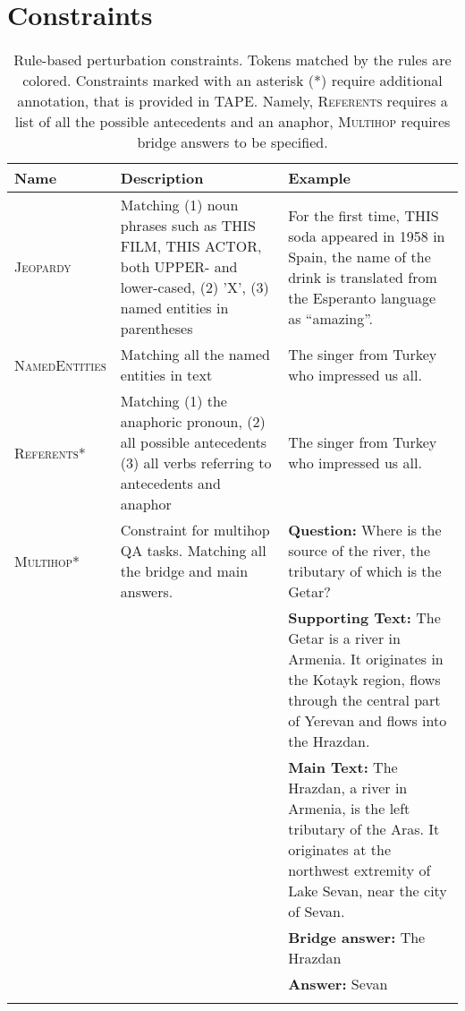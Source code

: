 \documentclass[11pt]{article}
\begin{document}
\onecolumn
\section{Constraints}
\label{app:constraints}


\begin{minipage}[hb!][20cm][t]{\textwidth}
\centering
\scriptsize
\begin{longtable}{lp{}p{}}
\toprule
\textbf{Name} &
  \textbf{Description} &
  \textbf{Example} \\ \midrule 
  \textsc{Jeopardy} & Matching (1) noun phrases such as THIS FILM, THIS ACTOR, both UPPER- and lower-cased, (2) 'X', (3) named entities in parentheses & For the first time, \colorbox{cb-salmon-pink}{THIS soda} appeared in 1958 in Spain, the name of the drink is translated from the Esperanto language as \colorbox{cb-salmon-pink}{“amazing”}. \\
  \midrule 
  \textsc{NamedEntities} & Matching all the named entities in text & The singer from \colorbox{cb-salmon-pink}{Turkey} who impressed us all. \\
  \midrule
  \textsc{Referents*} & Matching (1) the anaphoric pronoun, (2) all possible antecedents (3) all verbs referring to antecedents and anaphor & The \colorbox{cb-salmon-pink}{singer} from {Turkey} \colorbox{cb-salmon-pink}{who} \colorbox{cb-salmon-pink}{impressed} us all. \\
  \midrule
  \textsc{Multihop*} & Constraint for multihop QA tasks. Matching all the bridge and main answers. & \textbf{Question:} Where is the source of the river, the tributary of which is the Getar? \\
  & & \textbf{Supporting Text:} The \colorbox{cb-salmon-pink}{Getar} is a river in Armenia. It originates in the Kotayk region, flows through the central part of Yerevan and flows into \colorbox{cb-salmon-pink}{the Hrazdan}. \\
  & & \textbf{Main Text:} \colorbox{cb-salmon-pink}{The Hrazdan}, a river in Armenia, is the left tributary of the Aras. It originates at the northwest extremity of Lake \colorbox{cb-salmon-pink}{Sevan}, near the city of \colorbox{cb-salmon-pink}{Sevan}.\\
  & & \textbf{Bridge answer:} The Hrazdan \\
  & & \textbf{Answer:} Sevan \\
 \bottomrule
 \caption{Rule-based perturbation constraints. Tokens matched by the rules are colored. Constraints marked with an asterisk (*) require additional annotation, that is provided in TAPE. Namely, \textsc{Referents} requires a list of all the possible antecedents and an anaphor, \textsc{Multihop} requires bridge answers to be specified.}
\label{tab:constraints}
\end{longtable}\end{minipage}
\end{document}

